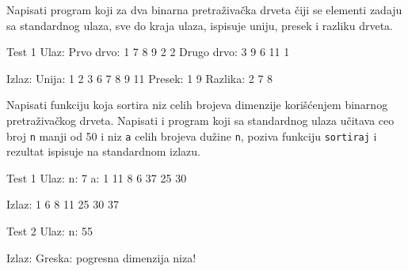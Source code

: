 \begin{Exercise}[label=708]
Napisati program koji za dva binarna pretraživačka drveta čiji se elementi zadaju sa standardnog ulaza, sve do kraja ulaza, ispisuje uniju, presek i razliku drveta. 

\begin{miditest}
\begin{test}{Test 1}
Ulaz:
Prvo drvo: 1 7 8 9 2 2
Drugo drvo: 3 9 6 11 1

Izlaz:
Unija: 1 2 3 6 7 8 9 11
Presek: 1 9 
Razlika: 2 7 8 
\end{test}
\end{miditest}

\end{Exercise}

\begin{Exercise}[label=709]
Napisati funkciju  koja sortira niz celih brojeva  dimenzije  korišćenjem binarnog pretraživačkog drveta. Napisati i program koji sa standardnog ulaza učitava ceo broj \verb|n| manji od 50 i niz \verb|a| celih brojeva dužine \verb|n|, poziva funkciju \verb|sortiraj| i rezultat ispisuje na standardnom izlazu.  

\begin{miditest}
\begin{test}{Test 1}
Ulaz:
n: 7 
a: 1 11 8 6 37 25 30

Izlaz:
1 6 8 11 25 30 37 
\end{test}
\end{miditest}

\begin{maxitest}
\begin{test}{Test 2}
Ulaz:
n: 55 

Izlaz:
Greska: pogresna dimenzija niza!
\end{test}
\end{maxitest}
\end{Exercise}

